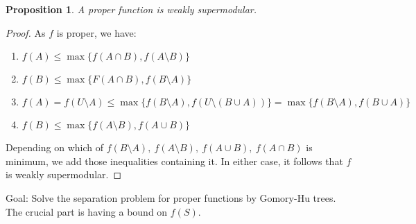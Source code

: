 \documentclass[11pt, a4paper]{article}
\newcommand{\set}[1]{\{#1\}}
\newtheorem{prop}[theorem]{Proposition}
\theoremstyle{remark}
\theoremstyle{definition}
\begin{document}
\begin{prop}
	A proper function is weakly supermodular.
\end{prop}
\begin{proof}
	As $f$ is proper, we have:
	\begin{enumerate}[label=(\arabic*)]
		\item $f(A)\leq\max\set{f(A\cap B), f(A\setminus B)}$
		\item $f(B)\leq\max\set{F(A\cap B), f(B\setminus A)}$
		\item $f(A)=f(U\setminus A)\leq\max\set{f(B\setminus A),f(U\setminus
				(B\cup A))}=\max\set{f(B\setminus A), f(B\cup A)}$
		\item $f(B)\leq \max\set{f(A\setminus B), f(A\cup B)}$
	\end{enumerate}
	Depending on which of $f(B\setminus A),\ f(A\setminus B),\ f(A\cup B),\
		f(A\cap B)$ is minimum, we add those inequalities containing it. In
	either case, it follows that $f$ is weakly supermodular.
\end{proof}


Goal: Solve the separation problem for proper functions by Gomory-Hu
trees. The crucial part is having a bound on $f(S)$.
\end{document}
